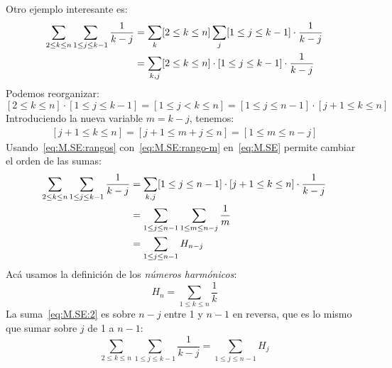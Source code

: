  Otro ejemplo interesante es:
  \begin{align}
    \sum_{2 \le k \le n} \sum_{1 \le j \le k - 1} \frac{1}{k - j}
      &= \sum_k [2 \le k \le n] \sum_j [1 \le j \le k - 1]
	   \cdot \frac{1}{k - j}
	       \notag \\
      &= \sum_{k, j}  [2 \le k \le n] \cdot [1 \le j \le k - 1]
	   \cdot \frac{1}{k - j}
	       \label{eq:M.SE}
  \end{align}
  Podemos reorganizar:
  \begin{equation}
    \label{eq:M.SE:rangos}
    [2 \le k \le n] \cdot [1 \le j \le k - 1]
      = [1 \le j < k \le n]
      = [1 \le j \le n - 1] \cdot [j + 1 \le k \le n]
  \end{equation}
  Introduciendo la nueva variable \(m = k - j\),
  tenemos:
  \begin{align}
    \label{eq:M.SE:rango-m}
    [j + 1 \le k \le n]
      = [j + 1 \le m + j \le n]
      = [1 \le m \le n - j]
  \end{align}
  Usando~\eqref{eq:M.SE:rangos} con~\eqref{eq:M.SE:rango-m}
  en~\eqref{eq:M.SE}
  permite cambiar el orden de las sumas:
  \begin{align}
    \sum_{2 \le k \le n} \sum_{1 \le j \le k - 1} \frac{1}{k - j}
      &= \sum_{k, j}  [1 \le j \le n - 1] \cdot [j + 1 \le k \le n]
	   \cdot \frac{1}{k - j} \notag \\
      &= \sum_{1 \le j \le n - 1} \sum_{1 \le m \le n - j}
	   \frac{1}{m} \\
      &= \sum_{1 \le j \le n - 1} H_{n - j} \label{eq:M.SE:2}
  \end{align}
  Acá usamos la definición de los \emph{números harmónicos}:%
  \begin{equation}
    \label{eq:definicion-numeros-harmonicos}
    H_n
      = \sum_{1 \le k \le n} \frac{1}{k}
  \end{equation}
  La suma~\eqref{eq:M.SE:2}
  es sobre \(n - j\) entre 1 y \(n - 1\) en reversa,
  que es lo mismo que sumar sobre \(j\) de 1 a \(n - 1\):
  \begin{equation}
    \label{eq:M.SE:3}
    \sum_{2 \le k \le n} \sum_{1 \le j \le k - 1} \frac{1}{k - j}
      = \sum_{1 \le j \le n - 1} H_j
  \end{equation}

